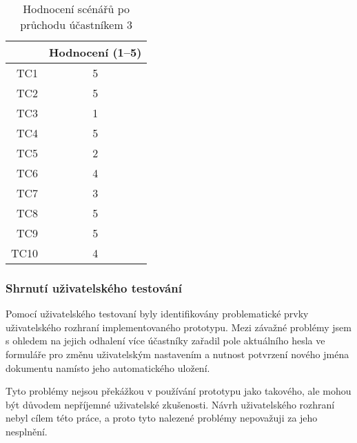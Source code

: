 \begin{table}[ht!]
    \centering
    \caption{Hodnocení scénářů po průchodu účastníkem 3}
    \label{tab:poPrůchoduÚčastníkem3}
    \begin{tabular}{r|c}
        & Hodnocení (1--5) \\ \hline
        TC1 & 5 \\
        TC2 & 5 \\
        TC3 & 1 \\
        TC4 & 5 \\
        TC5 & 2 \\
        TC6 & 4 \\
        TC7 & 3 \\
        TC8 & 5 \\
        TC9 & 5 \\
        TC10 & 4 \\
    \end{tabular}
\end{table}

\subsubsection{Shrnutí uživatelského testování}

Pomocí uživatelského testovaní byly identifikovány problematické prvky uživatelského rozhraní implementovaného prototypu.
Mezi závažné problémy jsem s ohledem na jejich odhalení více účastníky zařadil pole aktuálního hesla ve formuláře pro změnu uživatelským nastavením a nutnost potvrzení nového jména dokumentu namísto jeho automatického uložení.

Tyto problémy nejsou překážkou v používání prototypu jako takového, ale mohou být důvodem nepříjemné uživatelské zkušenosti.
Návrh uživatelského rozhraní nebyl cílem této práce, a proto tyto nalezené problémy nepovažuji za jeho nesplnění.

